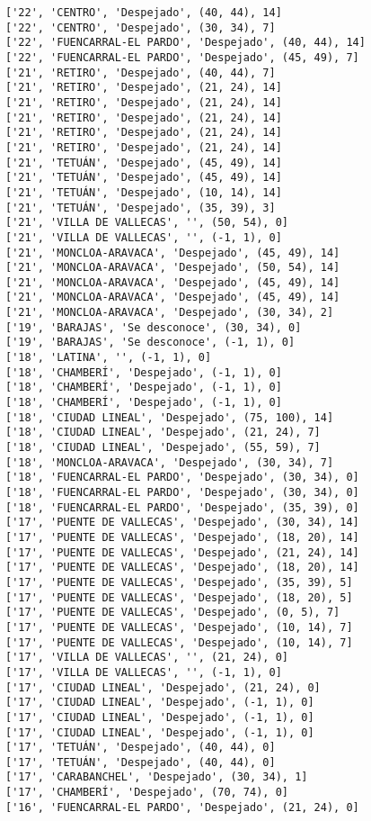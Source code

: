 \documentclass[11pt]{article}
\begin{document}
\begin{Verbatim}[commandchars=\\\{\}]
['22', 'CENTRO', 'Despejado', (40, 44), 14]
['22', 'CENTRO', 'Despejado', (30, 34), 7]
['22', 'FUENCARRAL-EL PARDO', 'Despejado', (40, 44), 14]
['22', 'FUENCARRAL-EL PARDO', 'Despejado', (45, 49), 7]
['21', 'RETIRO', 'Despejado', (40, 44), 7]
['21', 'RETIRO', 'Despejado', (21, 24), 14]
['21', 'RETIRO', 'Despejado', (21, 24), 14]
['21', 'RETIRO', 'Despejado', (21, 24), 14]
['21', 'RETIRO', 'Despejado', (21, 24), 14]
['21', 'RETIRO', 'Despejado', (21, 24), 14]
['21', 'TETUÁN', 'Despejado', (45, 49), 14]
['21', 'TETUÁN', 'Despejado', (45, 49), 14]
['21', 'TETUÁN', 'Despejado', (10, 14), 14]
['21', 'TETUÁN', 'Despejado', (35, 39), 3]
['21', 'VILLA DE VALLECAS', '', (50, 54), 0]
['21', 'VILLA DE VALLECAS', '', (-1, 1), 0]
['21', 'MONCLOA-ARAVACA', 'Despejado', (45, 49), 14]
['21', 'MONCLOA-ARAVACA', 'Despejado', (50, 54), 14]
['21', 'MONCLOA-ARAVACA', 'Despejado', (45, 49), 14]
['21', 'MONCLOA-ARAVACA', 'Despejado', (45, 49), 14]
['21', 'MONCLOA-ARAVACA', 'Despejado', (30, 34), 2]
['19', 'BARAJAS', 'Se desconoce', (30, 34), 0]
['19', 'BARAJAS', 'Se desconoce', (-1, 1), 0]
['18', 'LATINA', '', (-1, 1), 0]
['18', 'CHAMBERÍ', 'Despejado', (-1, 1), 0]
['18', 'CHAMBERÍ', 'Despejado', (-1, 1), 0]
['18', 'CHAMBERÍ', 'Despejado', (-1, 1), 0]
['18', 'CIUDAD LINEAL', 'Despejado', (75, 100), 14]
['18', 'CIUDAD LINEAL', 'Despejado', (21, 24), 7]
['18', 'CIUDAD LINEAL', 'Despejado', (55, 59), 7]
['18', 'MONCLOA-ARAVACA', 'Despejado', (30, 34), 7]
['18', 'FUENCARRAL-EL PARDO', 'Despejado', (30, 34), 0]
['18', 'FUENCARRAL-EL PARDO', 'Despejado', (30, 34), 0]
['18', 'FUENCARRAL-EL PARDO', 'Despejado', (35, 39), 0]
['17', 'PUENTE DE VALLECAS', 'Despejado', (30, 34), 14]
['17', 'PUENTE DE VALLECAS', 'Despejado', (18, 20), 14]
['17', 'PUENTE DE VALLECAS', 'Despejado', (21, 24), 14]
['17', 'PUENTE DE VALLECAS', 'Despejado', (18, 20), 14]
['17', 'PUENTE DE VALLECAS', 'Despejado', (35, 39), 5]
['17', 'PUENTE DE VALLECAS', 'Despejado', (18, 20), 5]
['17', 'PUENTE DE VALLECAS', 'Despejado', (0, 5), 7]
['17', 'PUENTE DE VALLECAS', 'Despejado', (10, 14), 7]
['17', 'PUENTE DE VALLECAS', 'Despejado', (10, 14), 7]
['17', 'VILLA DE VALLECAS', '', (21, 24), 0]
['17', 'VILLA DE VALLECAS', '', (-1, 1), 0]
['17', 'CIUDAD LINEAL', 'Despejado', (21, 24), 0]
['17', 'CIUDAD LINEAL', 'Despejado', (-1, 1), 0]
['17', 'CIUDAD LINEAL', 'Despejado', (-1, 1), 0]
['17', 'CIUDAD LINEAL', 'Despejado', (-1, 1), 0]
['17', 'TETUÁN', 'Despejado', (40, 44), 0]
['17', 'TETUÁN', 'Despejado', (40, 44), 0]
['17', 'CARABANCHEL', 'Despejado', (30, 34), 1]
['17', 'CHAMBERÍ', 'Despejado', (70, 74), 0]
['16', 'FUENCARRAL-EL PARDO', 'Despejado', (21, 24), 0]

\end{Verbatim}
\end{document}
